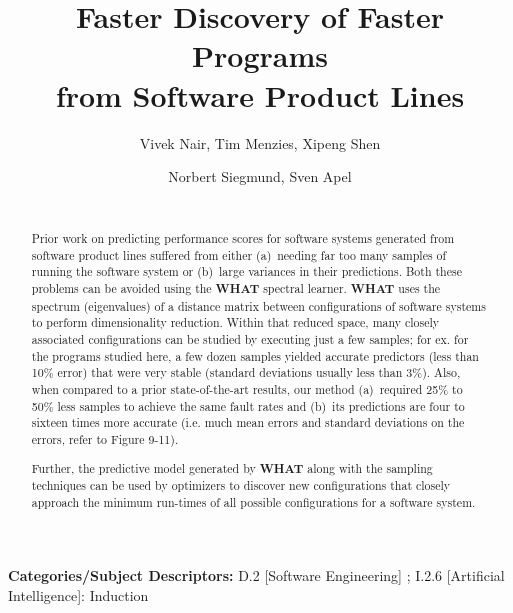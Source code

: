 \documentclass{sig-alternative}
\newcommand{\what}{{\bf WHAT }}
\begin{document}
\title{Faster Discovery  of Faster Programs \\from Software Product Lines} 
\author{
        \alignauthor Vivek Nair, Tim Menzies, Xipeng Shen 
    \and  
        \alignauthor Norbert Siegmund, Sven Apel \\
        \\
       }

\maketitle 
\thispagestyle{plain}
\pagestyle{plain}
\begin{abstract}
Prior work on predicting performance scores for software systems generated from
software product lines suffered from either (a)~needing far too many samples
of running the software system or (b)~large variances in their predictions.
Both these problems can be avoided using the \what spectral learner. 
\what  uses the spectrum (eigenvalues) of a distance matrix
between configurations of software systems to perform dimensionality reduction. Within that
reduced space, many closely associated configurations can be studied
by executing just a few samples; for ex. for the programs studied
here, a few dozen samples yielded accurate predictors (less than 10\% error)
that were very stable (standard deviations usually less than 3\%).  
Also, when compared to a prior state-of-the-art results, our method (a)~required  
25\% to 50\% less samples to achieve the same fault rates
and (b)~its predictions are   four to sixteen times more accurate (i.e. much mean errors
and standard deviations on the errors, refer to Figure 9-11). 

Further, the predictive model generated by
\what along with the sampling techniques can be used by optimizers to discover new configurations that closely
approach the minimum run-times of all possible configurations for a software system.
\end{abstract}

\vspace{1mm}
\noindent
{\bf Categories/Subject Descriptors:} 
D.2 [Software Engineering] ;
I.2.6 [Artificial Intelligence]: Induction
\end{document}
